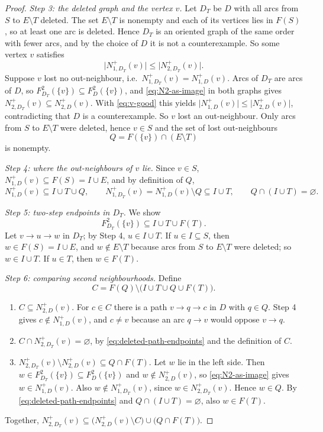 \documentclass[11pt]{article}
\theoremstyle{remark}
\newcommand{\abs}[1]{\lvert #1\rvert}
\begin{document}
\begin{proof}
\smallskip\noindent\emph{Step 3: the deleted graph and the vertex $v$.}
Let $D_T$ be $D$ with all arcs from $S$ to $E\setminus T$ deleted.  The set
$E\setminus T$ is nonempty and each of its vertices lies in $F(S)$, so at
least one arc is deleted.  Hence $D_T$ is an oriented graph of the same order
with fewer arcs, and by the choice of $D$ it is not a counterexample.  So
some vertex $v$ satisfies
\begin{equation}\label{eq:v-good}
 \abs{N_{1,D_T}^+(v)}\le\abs{N_{2,D_T}^+(v)}.
\end{equation}
Suppose $v$ lost no out-neighbour, i.e.\ $N_{1,D_T}^+(v)=N_{1,D}^+(v)$.
Arcs of $D_T$ are arcs of $D$, so $F_{D_T}^2(\{v\})\subseteq F_D^2(\{v\})$,
and \eqref{eq:N2-as-image} in both graphs gives
$N_{2,D_T}^+(v)\subseteq N_{2,D}^+(v)$.  With \eqref{eq:v-good} this yields
$\abs{N_{1,D}^+(v)}\le\abs{N_{2,D}^+(v)}$, contradicting that $D$ is a
counterexample.  So $v$ lost an out-neighbour.  Only arcs from $S$ to
$E\setminus T$ were deleted, hence $v\in S$ and the set of lost
out-neighbours
\[
  Q=F(\{v\})\cap(E\setminus T)
\]
is nonempty.

\smallskip\noindent\emph{Step 4: where the out-neighbours of $v$ lie.}
Since $v\in S$, $N_{1,D}^+(v)\subseteq F(S)=I\cup E$, and by definition of
$Q$,
\[
 N_{1,D}^+(v)\subseteq I\cup T\cup Q,\qquad
 N_{1,D_T}^+(v)=N_{1,D}^+(v)\setminus Q\subseteq I\cup T,\qquad
 Q\cap(I\cup T)=\varnothing .
\]

\smallskip\noindent\emph{Step 5: two-step endpoints in $D_T$.}  We show
\begin{equation}
\label{eq:deleted-path-endpoints}
  F_{D_T}^2(\{v\})\subseteq I\cup T\cup F(T).
\end{equation}
Let $v\to u\to w$ in $D_T$; by Step 4, $u\in I\cup T$.  If $u\in I\subseteq S$,
then $w\in F(S)=I\cup E$, and $w\notin E\setminus T$ because arcs from $S$ to
$E\setminus T$ were deleted; so $w\in I\cup T$.  If $u\in T$, then
$w\in F(T)$.

\smallskip\noindent\emph{Step 6: comparing second neighbourhoods.}  Define
\[
  C=F(Q)\setminus\bigl(I\cup T\cup Q\cup F(T)\bigr).
\]
\begin{enumerate}[label=(\roman*),leftmargin=*]
\item $C\subseteq N_{2,D}^+(v)$.  For $c\in C$ there is a path $v\to q\to c$
in $D$ with $q\in Q$.  Step 4 gives $c\notin N_{1,D}^+(v)$, and $c\ne v$
because an arc $q\to v$ would oppose $v\to q$.
\item $C\cap N_{2,D_T}^+(v)=\varnothing$, by
\eqref{eq:deleted-path-endpoints} and the definition of $C$.
\item $N_{2,D_T}^+(v)\setminus N_{2,D}^+(v)\subseteq Q\cap F(T)$.  Let $w$
lie in the left side.  Then $w\in F_{D_T}^2(\{v\})\subseteq F_D^2(\{v\})$
and $w\notin N_{2,D}^+(v)$, so \eqref{eq:N2-as-image} gives
$w\in N_{1,D}^+(v)$.  Also $w\notin N_{1,D_T}^+(v)$, since
$w\in N_{2,D_T}^+(v)$.  Hence $w\in Q$.  By
\eqref{eq:deleted-path-endpoints} and $Q\cap(I\cup T)=\varnothing$, also
$w\in F(T)$.
\end{enumerate}
Together,
$N_{2,D_T}^+(v)\subseteq\bigl(N_{2,D}^+(v)\setminus C\bigr)\cup
\bigl(Q\cap F(T)\bigr)$.


\end{proof}
\end{document}
